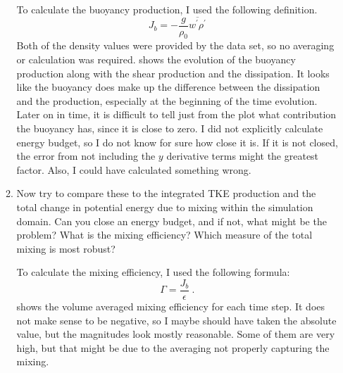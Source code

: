 \documentclass[11pt]{article}
\begin{document}
\begin{enumerate}
\begin{enumerate}
			To calculate the buoyancy production, I used the following definition.
			\begin{equation}
				J_b = -\frac{g}{\rho_0} \overline{w^{\prime}\rho^{\prime}}
			\end{equation}
			Both of the density values were provided by the data set, so no averaging or calculation was required.  shows the evolution of the buoyancy production along with the shear production and the dissipation. It looks like the buoyancy does make up the difference between the dissipation and the production, especially at the beginning of the time evolution. Later on in time, it is difficult to tell just from the plot what contribution the buoyancy has, since it is close to zero. I did not explicitly calculate energy budget, so I do not know for sure how close it is. If it is not closed, the error from not including the $y$ derivative terms might the greatest factor. Also, I could have calculated something wrong.
			
			
			\item  Now try to compare these to the integrated TKE production and the total change in potential energy due to mixing within the simulation domain. Can you close an energy budget, and if not, what might be the problem? What is the mixing efficiency? Which measure of the total mixing is most robust?\par
			
			To calculate the mixing efficiency, I used the following formula:
			\begin{equation}
				\Gamma = \frac{J_b}{\epsilon}\:.
			\end{equation}
			 shows the volume averaged mixing efficiency for each time step. It does not make sense to be negative, so I maybe should have taken the absolute value, but the magnitudes look mostly reasonable. Some of them are very high, but that might be due to the averaging not properly capturing the mixing.
			
			
			
			
		
		\end{enumerate}
		
	\end{enumerate}
		
	
	
	
	
	
	
	
	
	
\end{document}
